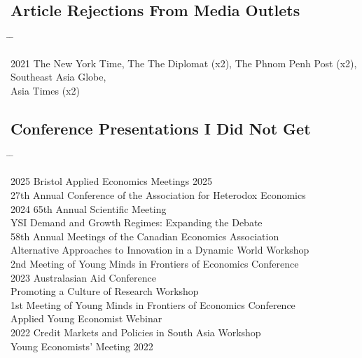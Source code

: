 \documentclass[10pt,a4paper]{article}
\newcommand{\tabbedblock}[1]{

	\begin{tabbing}
		\hspace{2cm} \= \hspace{4cm} \= \kill
		#1
	\end{tabbing}
}
\begin{document}
\subsection*{Article Rejections From Media Outlets}

\tabbedblock{
	2021 \> The New York Time, The The Diplomat (x2), The Phnom Penh Post (x2), Southeast Asia Globe, \\
	\> Asia Times (x2) 
	
}
\subsection*{Conference Presentations I Did Not Get}

\tabbedblock{
	
	2025 \> Bristol Applied Economics Meetings 2025 \\
			 \> 27th Annual Conference of the Association for Heterodox Economics \\
	
	2024 \> 65th Annual Scientific Meeting \\
			\> YSI Demand and Growth Regimes: Expanding the Debate \\
			\> 58th Annual Meetings of the Canadian Economics Association \\
			\> Alternative Approaches to Innovation in a Dynamic World Workshop \\
			\> 2nd Meeting of Young Minds in Frontiers of Economics Conference \\
	
	2023 \> 2023 Australasian Aid Conference \\
			\> Promoting a Culture of Research Workshop \\
			\> 1st Meeting of Young Minds in Frontiers of Economics Conference \\
			\> Applied Young Economist Webinar \\
	2022 \> Credit Markets and Policies in South Asia Workshop \\
			\> Young Economists' Meeting 2022
}


\end{document}
